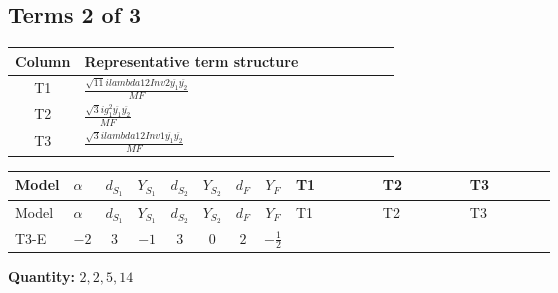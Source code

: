 \documentclass[8pt]{article}
\begin{document}
\begin{landscape}
\subsection*{Terms 2 of 3}
\begin{center}
\begin{tabular}{@{}c >{\raggedright\arraybackslash}p{0.82\linewidth}@{}}
\toprule
Column & Representative term structure \\
\midrule
T1 & \(\displaystyle \frac{\sqrt{11} i lambda12Inv2 \overline{y_{1}} \overline{y_{2}}}{MF}\) \\
\midrule
T2 & \(\displaystyle \frac{\sqrt{3} i g_{1}^{2} \overline{y_{1}} \overline{y_{2}}}{MF}\) \\
\midrule
T3 & \(\displaystyle \frac{\sqrt{3} i lambda12Inv1 \overline{y_{1}} \overline{y_{2}}}{MF}\) \\
\midrule
\bottomrule
\end{tabular}
\end{center}
\smallskip
\tiny
\begin{longtable}{@{}llcccccc >{\raggedright\arraybackslash}p{0.21\linewidth} >{\raggedright\arraybackslash}p{0.21\linewidth} >{\raggedright\arraybackslash}p{0.21\linewidth}@{}}
\toprule
Model & $\alpha$ & $d_{S_1}$ & $Y_{S_1}$ & $d_{S_2}$ & $Y_{S_2}$ & $d_F$ & $Y_F$ & T1 & T2 & T3 \\
\midrule
\endfirsthead
\toprule
Model & $\alpha$ & $d_{S_1}$ & $Y_{S_1}$ & $d_{S_2}$ & $Y_{S_2}$ & $d_F$ & $Y_F$ & T1 & T2 & T3 \\
\midrule
\endhead
T3-E & $-2$ & $3$ & $-1$ & $3$ & $0$ & $2$ & $-\frac{1}{2}$ & \scriptsize\adjustbox{max width=\linewidth}{$\begin{gathered} - \frac{3 \sqrt{11} i lambda12Inv2 \overline{y_{1}} \overline{y_{2}}}{22 MF}\end{gathered}$} & \scriptsize\adjustbox{max width=\linewidth}{$\begin{gathered} - \frac{\sqrt{3} i g_{1}^{2} \overline{y_{1}} \overline{y_{2}}}{8 MF}\end{gathered}$} & \scriptsize\adjustbox{max width=\linewidth}{$\begin{gathered} \frac{\sqrt{3} i lambda12Inv1 \overline{y_{1}} \overline{y_{2}}}{6 MF}\end{gathered}$} \\
\midrule
\bottomrule
\end{longtable}
\clearpage
\noindent\textbf{Quantity: }$\mathrm{2,2,5,14}$\par\smallskip

\end{landscape}
\end{document}
